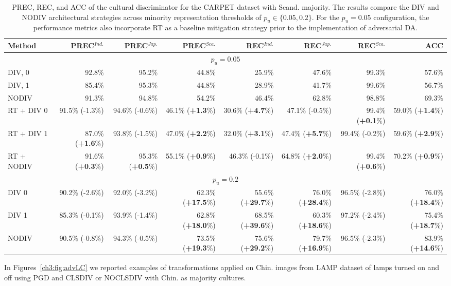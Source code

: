 %
\begin{table}
\centering
\scriptsize
\setlength{\tabcolsep}{0.1cm}
\begin{tabular}{lrrrrrrr}
\toprule
\textbf{Method} & \textbf{PREC}$^{Ind.}$  & \textbf{PREC}$^{Jap.}$ & \textbf{PREC}$^{Sca.}$ & \textbf{REC}$^{Ind.}$ & \textbf{REC}$^{Jap.}$ & \textbf{REC}$^{Sca.}$ &  \textbf{ACC}\\
\midrule
\multicolumn{8}{c}{$p_u=0.05$} \\
\midrule
DIV, 0 & 92.8\%&	95.2\%&	44.8\%&	25.9\%&	47.6\%&	99.3\%&	57.6\%	\\
DIV, 1 & 85.4\%&	95.3\%&	44.8\%&	28.9\%&	41.7\%&	99.6\%&	56.7\%\\
NODIV & 91.3\%	&	94.8\%&	54.2\%&	46.4\%&	62.8\%&	98.8\%&	69.3\%\\
\midrule
RT + DIV 0      & 91.5\% (-1.3\%) & 94.6\% (-0.6\%) & 46.1\% (\textbf{+1.3}\%) & 30.6\% (\textbf{+4.7}\%) & 47.1\% (-0.5\%) & 99.4\% (\textbf{+0.1}\%) & 59.0\% (\textbf{+1.4}\%) \\
RT + DIV 1      & 87.0\% (\textbf{+1.6}\%) & 93.8\% (-1.5\%) & 47.0\% (\textbf{+2.2}\%) & 32.0\% (\textbf{+3.1}\%) & 47.4\% (\textbf{+5.7}\%) & 99.4\% (-0.2\%) & 59.6\% (\textbf{+2.9}\%) \\
RT + NODIV      & 91.6\% (\textbf{+0.3}\%) & 95.3\% (\textbf{+0.5}\%) & 55.1\% (\textbf{+0.9}\%) & 46.3\% (-0.1\%) & 64.8\% (\textbf{+2.0}\%) & 99.4\% (\textbf{+0.6}\%) & 70.2\% (\textbf{+0.9}\%) \\
\midrule
\multicolumn{8}{c}{$p_u=0.2$} \\
\midrule
DIV 0           & 90.2\% (-2.6\%) & 92.0\% (-3.2\%) & 62.3\% (\textbf{+17.5}\%) & 55.6\% (\textbf{+29.7}\%) & 76.0\% (\textbf{+28.4}\%) & 96.5\% (-2.8\%) & 76.0\% (\textbf{+18.4}\%) \\
DIV 1           & 85.3\% (-0.1\%) & 93.9\% (-1.4\%) & 62.8\% (\textbf{+18.0}\%) & 68.5\% (\textbf{+39.6}\%) & 60.3\% (\textbf{+18.6}\%) & 97.2\% (-2.4\%) & 75.4\% (\textbf{+18.7}\%) \\
NODIV           & 90.5\% (-0.8\%) & 94.3\% (-0.5\%) & 73.5\% (\textbf{+19.3}\%) & 75.6\% (\textbf{+29.2}\%) & 79.7\% (\textbf{+16.9}\%) & 96.5\% (-2.3\%) & 83.9\% (\textbf{+14.6}\%) \\
\midrule
\end{tabular}
\caption{PREC, REC, and ACC of the cultural discriminator for the CARPET dataset with Scand. majority. The results compare the DIV and NODIV architectural strategies across minority representation thresholds of $p_u \in \{0.05, 0.2\}$. For the $p_u = 0.05$ configuration, the performance metrics also incorporate RT as a baseline mitigation strategy prior to the implementation of adversarial DA.}
\label{ch3:tab:discr:CS}
\end{table}
%
In Figures~\ref{ch3:fig:advLC} we reported examples of transformations applied on Chin. images from LAMP dataset of lamps turned on and off using PGD and CLSDIV or NOCLSDIV with Chin. as majority cultures.

